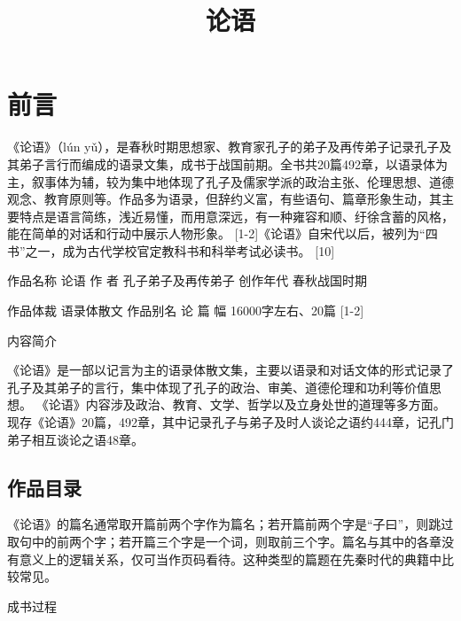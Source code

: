 \documentclass[a4paper,12pt,UTF8,twoside]{ctexbook}
\title{\heiti\zihao{0} 论语}
\author{}
\date{}
\begin{document}
\maketitle
\tableofcontents

\frontmatter
\chapter{前言}

《论语》（lún yǔ），是春秋时期思想家、教育家孔子的弟子及再传弟子记录孔子及其弟子言行而编成的语录文集，成书于战国前期。全书共20篇492章，以语录体为主，叙事体为辅，较为集中地体现了孔子及儒家学派的政治主张、伦理思想、道德观念、教育原则等。作品多为语录，但辞约义富，有些语句、篇章形象生动，其主要特点是语言简练，浅近易懂，而用意深远，有一种雍容和顺、纡徐含蓄的风格，能在简单的对话和行动中展示人物形象。 [1-2]《论语》自宋代以后，被列为“四书”之一，成为古代学校官定教科书和科举考试必读书。 [10]

作品名称
论语 
作    者
孔子弟子及再传弟子 
创作年代
春秋战国时期 

作品体裁
语录体散文 
作品别名
论 
篇    幅
16000字左右、20篇 [1-2]


内容简介

《论语》是一部以记言为主的语录体散文集，主要以语录和对话文体的形式记录了孔子及其弟子的言行，集中体现了孔子的政治、审美、道德伦理和功利等价值思想。
《论语》内容涉及政治、教育、文学、哲学以及立身处世的道理等多方面。现存《论语》20篇，492章，其中记录孔子与弟子及时人谈论之语约444章，记孔门弟子相互谈论之语48章。

\section{作品目录}

《论语》的篇名通常取开篇前两个字作为篇名；若开篇前两个字是“子曰”，则跳过取句中的前两个字；若开篇三个字是一个词，则取前三个字。篇名与其中的各章没有意义上的逻辑关系，仅可当作页码看待。这种类型的篇题在先秦时代的典籍中比较常见。


成书过程
\end{document}
